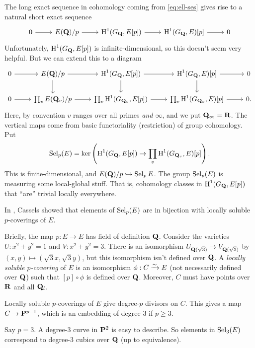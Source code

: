 The long exact sequence in cohomology coming from \eqref{eq:ell-ses} gives 
rise to a natural short exact sequence 
\[\begin{tikzcd}
  0 \ar[r] 
    & E(\dQ)/p \ar[r] 
    & \h^1(G_\dQ,E[p]) \ar[r] 
    & \h^1(G_\dQ,E)[p] \ar[r] 
    & 0
\end{tikzcd}\]
Unfortunately, $\operatorname{H}^1(G_{\mathbf{Q}},E[p])$ is infinite-dimensional, so this doesn't seem 
very helpful. But we can extend this to a diagram 
\[\begin{tikzcd}
  0 \ar[r] 
    & E(\dQ)/p \ar[r] \ar[d] 
    & \h^1(G_\dQ,E[p]) \ar[r] \ar[d] 
    & \h^1(G_\dQ,E)[p] \ar[r] \ar[d] 
    & 0 \\
  0 \ar[r] 
    & \prod_v E(\dQ_v)/p \ar[r] 
    & \prod_v \h^1(G_{\dQ_v},E[p]) \ar[r] 
    & \prod_v \h^1(G_{\dQ_v},E)[p] \ar[r] 
    & 0 .
\end{tikzcd}\]
Here, by convention $v$ ranges over all primes \emph{and $\infty$}, and we 
put $\mathbf{Q}_\infty=\mathbf{R}$. The vertical maps come from basic functoriality 
(restriction) of group cohomology. Put 
\[
  \operatorname{Sel}_p(E) = \ker\left(\operatorname{H}^1(G_{\mathbf{Q}},E[p]) \to \prod_v \operatorname{H}^1(G_{\mathbf{Q}_v},E)[p]\right) .
\]
This is finite-dimensional, and $E(\mathbf{Q})/p\hookrightarrow \operatorname{Sel}_p E$. The group 
$\operatorname{Sel}_p(E)$ is measuring some local-global stuff. That is, cohomology 
classes in $\operatorname{H}^1(G_{\mathbf{Q}},E[p])$ that ``are'' trivial locally everywhere. 

In \cite{cassels-1962}, Cassels showed that elements of $\operatorname{Sel}_p(E)$ are in 
bijection with locally soluble $p$-coverings of $E$. 

Briefly, the map $p:E\to E$ has field of definition $\mathbf{Q}$. Consider the varieties 
$U:x^2+y^2=1$ and $V:x^2+y^2=3$. There is an isomorphism 
$U_{\mathbf{Q}(\sqrt 3)} \to V_{\mathbf{Q}(\sqrt 3)}$ by $(x,y)\mapsto (\sqrt 3x,\sqrt 3 y)$, 
but this isomorphism isn't defined over $\mathbf{Q}$. A \emph{locally soluble 
$p$-covering} of $E$ is an isomorphism $\phi:C\xrightarrow\sim E$ (not necessarily 
defined over $\mathbf{Q}$) such that $[p]\circ \phi$ is defined over $\mathbf{Q}$. Moreover, 
$C$ must have points over $\mathbf{R}$ and all $\mathbf{Q}_l$. 

Locally soluble $p$-coverings of $E$ give degree-$p$ divisors on $C$. This 
gives a map $C\to \mathbf{P}^{p-1}$, which is an embedding of degree $3$ if 
$p\geqslant 3$. 

Say $p=3$. A degree-$3$ curve in $\mathbf{P}^2$ is easy to describe. So elements in 
$\operatorname{Sel}_3(E)$ correspond to degree-$3$ cubics over $\mathbf{Q}$ (up to equivalence). 

